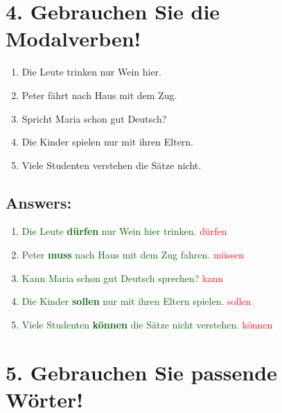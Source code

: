 \documentclass[12pt]{article}
\begin{document}
\vspace{1em}

\section*{4. Gebrauchen Sie die Modalverben!}

\begin{enumerate}
    \item Die Leute trinken nur Wein hier.
    \item Peter fährt nach Haus mit dem Zug.
    \item Spricht Maria schon gut Deutsch?
    \item Die Kinder spielen nur mit ihren Eltern.
    \item Viele Studenten verstehen die Sätze nicht.
\end{enumerate}
\subsection*{Answers:}
\begin{enumerate}
    \item \textcolor{darkgreen}{Die Leute \textbf{dürfen} nur Wein hier trinken.} \textcolor{red}{dürfen}
    \item \textcolor{darkgreen}{Peter \textbf{muss} nach Haus mit dem Zug fahren.} \textcolor{red}{müssen}
    \item \textcolor{darkgreen}{Kann Maria schon gut Deutsch sprechen?} \textcolor{red}{kann}
    \item \textcolor{darkgreen}{Die Kinder \textbf{sollen} nur mit ihren Eltern spielen.} \textcolor{red}{sollen}
    \item \textcolor{darkgreen}{Viele Studenten \textbf{können} die Sätze nicht verstehen.} \textcolor{red}{können}
\end{enumerate}


\vspace{1em}

\section*{5. Gebrauchen Sie passende Wörter!}
\end{document}
